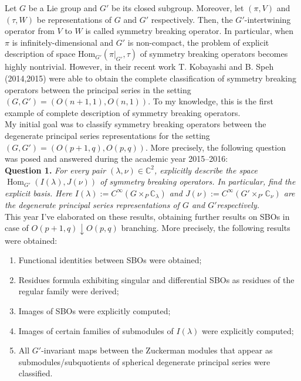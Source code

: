 \documentclass[a4j,twocolumn]{jarticle}
\begin{document}
\vspace{0.5cm}
Let $G$ be a Lie group and $G'$ be its closed subgroup. Moreover, let $(\pi,V)$ and $(\tau,W)$ be representations of $G$ and $G'$
respectively. Then, the $G'$-intertwining operator from $V$ to $W$ is called symmetry breaking operator. In particular, when 
$\pi$ is infinitely-dimensional and $G'$ is non-compact, the problem of explicit description of space
$\mbox{Hom}_{G'}(\pi\big|_{G'},\tau)$ of symmetry breaking operators becomes highly nontrivial. However, in their recent work 
T. Kobayashi and B. Speh (2014,2015) were able to obtain the complete classification of symmetry breaking operators between
the principal series in the setting $(G, G') = (O(n+1,1),O(n,1))$. To my knowledge, this is the first example of complete
description of symmetry breaking operators.\\
My initial goal was to classify symmetry breaking operators between the degenerate principal series representations for the setting
$(G, G') = (O(p+1,q),O(p,q))$. More precisely, the following question was posed and answered during the academic year 2015--2016:\\
{\noindent}\textbf{Question \textbf{1}. }{\itshape{For every pair $( \lambda, \nu) \in
\mathbb{C}^2$, explicitly describe the space
$\operatorname{Hom}_{G'}(I(\lambda),J(\nu))$ of symmetry breaking operators. In particular, find the explicit basis.
Here $I(\lambda):=C^{\infty}\left(  G\times_P\mathbb{C}_\lambda\right)$
and $J(\nu):=C^{\infty}\left( G'\times_{P'}\mathbb{C}_{\nu} \right)$ are the degenerate principal series representations of $G$ and
$G'$respectively.}}\\
This year I've elaborated on these results, obtaining further results on SBOs in case of $O(p+1,q)\downarrow O(p,q)$ branching. More precisely, the following results were obtained:
\begin{enumerate}
	\item Functional identities between SBOs were obtained;
	\item Residues formula exhibiting singular and differential SBOs as residues of the regular family were derived;
	\item Images of SBOs were explicitly computed;
	\item Images of certain families of submodules of $I(\lambda)$ were explicitly computed;
	\item
		All $G'$-invariant maps between the Zuckerman modules that appear as submodules/subquotients
		of spherical degenerate principal series were classified.
\end{enumerate}
\end{document}
